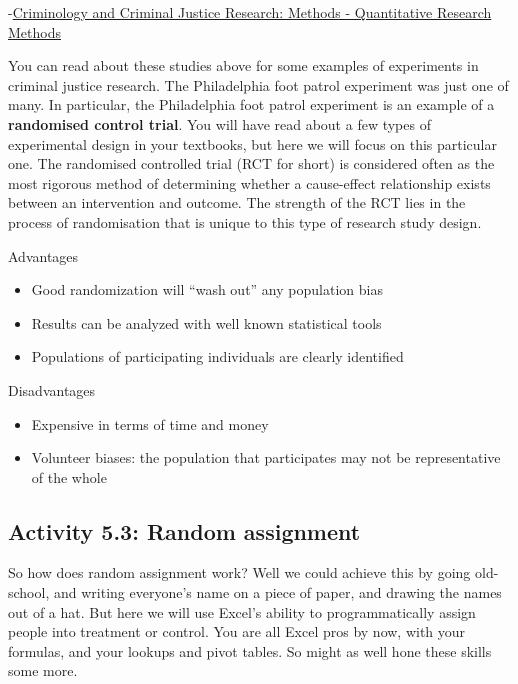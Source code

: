 \documentclass[
]{book}
\providecommand{\tightlist}{%
  \setlength{\itemsep}{0pt}\setlength{\parskip}{0pt}}
\begin{document}
-\href{http://law.jrank.org/pages/923/Criminology-Criminal-Justice-Research-Methods-Quantitative-research-methods.html}{Criminology and Criminal Justice Research: Methods - Quantitative Research Methods}

You can read about these studies above for some examples of experiments in criminal justice research. The Philadelphia foot patrol experiment was just one of many. In particular, the Philadelphia foot patrol experiment is an example of a \textbf{randomised control trial}. You will have read about a few types of experimental design in your textbooks, but here we will focus on this particular one. The randomised controlled trial (RCT for short) is considered often as the most rigorous method of determining whether a cause-effect relationship exists between an intervention and outcome. The strength of the RCT lies in the process of randomisation that is unique to this type of research study design.

Advantages

\begin{itemize}
\tightlist
\item
  Good randomization will ``wash out'' any population bias
\item
  Results can be analyzed with well known statistical tools
\item
  Populations of participating individuals are clearly identified
\end{itemize}

Disadvantages

\begin{itemize}
\tightlist
\item
  Expensive in terms of time and money
\item
  Volunteer biases: the population that participates may not be representative of the whole
\end{itemize}

\hypertarget{activity-5.3-random-assignment}{%
\subsection{Activity 5.3: Random assignment}\label{activity-5.3-random-assignment}}

So how does random assignment work? Well we could achieve this by going old-school, and writing everyone's name on a piece of paper, and drawing the names out of a hat. But here we will use Excel's ability to programmatically assign people into treatment or control. You are all Excel pros by now, with your formulas, and your lookups and pivot tables. So might as well hone these skills some more.
\end{document}
